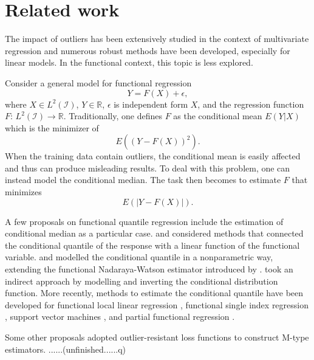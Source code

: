 \documentclass{article}
\begin{document}




\section{Related work}
The impact of outliers has been extensively studied in the context of multivariate regression and numerous robust methods have been developed, especially for linear models.  In the functional context, this topic is less explored.  

Consider a general  model for functional regression
\begin{equation}\label{eq:general}
Y = 	F(X) + \epsilon, 
\end{equation}
where $X \in L^2 (\mathcal{I})$, $Y \in \mathbb{R}$, $\epsilon$ is independent form $X$, and the regression function  $F$: $L^2 (\mathcal{I}) \rightarrow \mathbb{R}$. Traditionally, one defines $F$ as  the conditional mean $E(Y|X)$ which is the minimizer of 
$$E( (Y - F(X) )^2).$$
When the training data contain outliers, the conditional mean is  easily affected and thus can produce misleading results. To deal with this problem, one can instead model the conditional median.  The task then becomes to estimate $F$ that minimizes 
$$E( |Y - F(X)|).$$

A few proposals on functional quantile regression 
include the estimation of conditional median as a particular case. \cite{cardot2005quantile} and  \cite{kato2012estimation} considered methods that connected the conditional quantile of the response with a linear function of the functional variable. \cite{ferraty2005conditional} and \cite{crambes2008robust}  modelled the conditional quantile in a nonparametric way,  extending the functional Nadaraya-Watson estimator introduced by \cite{ferraty2002functional}.  \cite{chen2012conditional} took an indirect approach by modelling and inverting the  conditional distribution function. More recently, methods to estimate the conditional quantile have been developed for functional local linear regression \citep{kaid2017functional,al2019functional}, functional single index regression \citep{sang2020functional}, support vector machines \citep{crambes2013support}, and partial functional regression \citep{qingguo2017quantile}.  

Some other proposals adopted outlier-resistant loss functions to construct M-type estimators. ......(unfinished......q)
\end{document}
